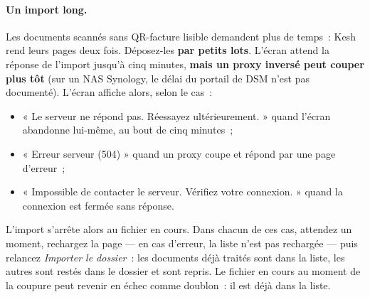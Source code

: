 \documentclass[a4paper,11pt,oneside]{article}
\begin{document}
\paragraph{Un import long.} Les documents scannés sans QR-facture lisible demandent plus de
temps~: Kesh rend leurs pages deux fois. Déposez-les \textbf{par petits lots}. L'écran attend
la réponse de l'import jusqu'à cinq minutes, \textbf{mais un proxy inversé peut couper plus
tôt} (sur un NAS Synology, le délai du portail de DSM n'est pas documenté). L'écran affiche
alors, selon le cas~:
\begin{itemize}
    \item « Le serveur ne répond pas. Réessayez ultérieurement. » quand l'écran abandonne
          lui-même, au bout de cinq minutes~;
    \item « Erreur serveur (504) » quand un proxy coupe et répond par une page d'erreur~;
    \item « Impossible de contacter le serveur. Vérifiez votre connexion. » quand la
          connexion est fermée sans réponse.
\end{itemize}
L'import s'arrête alors au fichier en cours. Dans chacun de ces cas, attendez un moment,
rechargez la page --- en cas d'erreur, la liste n'est pas rechargée --- puis relancez
\emph{Importer le dossier}~: les documents déjà traités sont dans la liste, les autres sont
restés dans le dossier et sont repris. Le fichier en cours au moment de la coupure peut
revenir en échec comme doublon~: il est déjà dans la liste.
\end{document}
